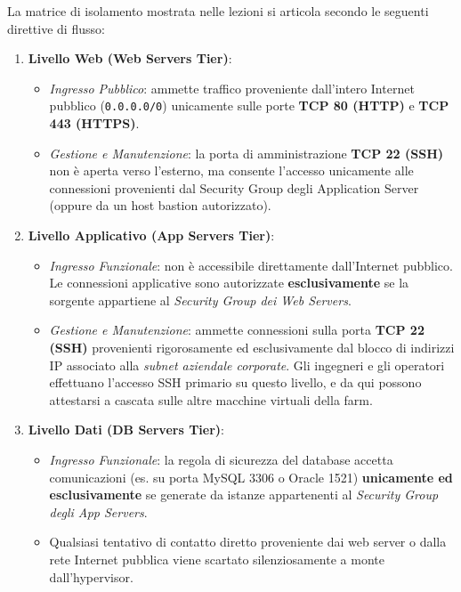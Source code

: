 \documentclass[11pt, a4paper]{article}
\begin{document}

La matrice di isolamento mostrata nelle lezioni si articola secondo le seguenti direttive di flusso:

\begin{enumerate}
    \item \textbf{Livello Web (Web Servers Tier)}:
    \begin{itemize}
        \item \emph{Ingresso Pubblico}: ammette traffico proveniente dall'intero Internet pubblico (\texttt{0.0.0.0/0}) unicamente sulle porte \textbf{TCP 80 (HTTP)} e \textbf{TCP 443 (HTTPS)}.
        \item \emph{Gestione e Manutenzione}: la porta di amministrazione \textbf{TCP 22 (SSH)} non è aperta verso l'esterno, ma consente l'accesso unicamente alle connessioni provenienti dal Security Group degli Application Server (oppure da un host bastion autorizzato).
    \end{itemize}
    \item \textbf{Livello Applicativo (App Servers Tier)}:
    \begin{itemize}
        \item \emph{Ingresso Funzionale}: non è accessibile direttamente dall'Internet pubblico. Le connessioni applicative sono autorizzate \textbf{esclusivamente} se la sorgente appartiene al \emph{Security Group dei Web Servers}.
        \item \emph{Gestione e Manutenzione}: ammette connessioni sulla porta \textbf{TCP 22 (SSH)} provenienti rigorosamente ed esclusivamente dal blocco di indirizzi IP associato alla \emph{subnet aziendale corporate}. Gli ingegneri e gli operatori effettuano l'accesso SSH primario su questo livello, e da qui possono attestarsi a cascata sulle altre macchine virtuali della farm.
    \end{itemize}
    \item \textbf{Livello Dati (DB Servers Tier)}:
    \begin{itemize}
        \item \emph{Ingresso Funzionale}: la regola di sicurezza del database accetta comunicazioni (es. su porta MySQL 3306 o Oracle 1521) \textbf{unicamente ed esclusivamente} se generate da istanze appartenenti al \emph{Security Group degli App Servers}.
        \item Qualsiasi tentativo di contatto diretto proveniente dai web server o dalla rete Internet pubblica viene scartato silenziosamente a monte dall'hypervisor.
    \end{itemize}
\end{enumerate}
\end{document}
